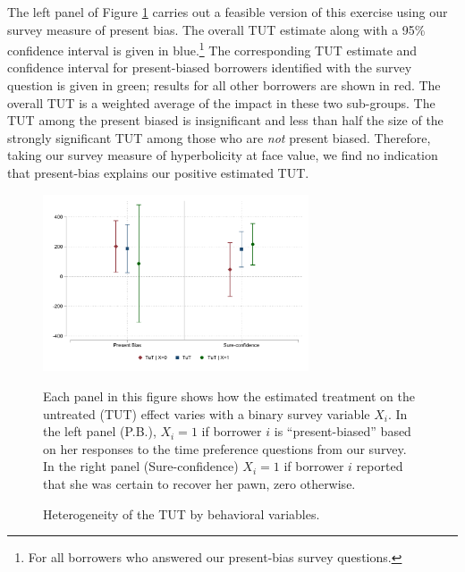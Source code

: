 \documentclass[11pt, a4paper]{article}
\begin{document}
The left panel of Figure \ref{tut_beh_partition} carries out a feasible version of this exercise using our survey measure of present bias.
The overall TUT estimate along with a 95\% confidence interval is given in blue.\footnote{For all borrowers who answered our present-bias survey questions.}
The corresponding TUT estimate and confidence interval for present-biased borrowers identified with the survey question is given in green; results for all other borrowers are shown in red.
The overall TUT is a weighted average of the impact in these two sub-groups.  The TUT among the present biased is insignificant and less than half the size of the strongly significant TUT among those who are \textit{not} present biased. Therefore, taking our survey measure of hyperbolicity at face value, we find no indication that present-bias explains our positive estimated TUT. 



\begin{figure}
    \begin{center}
        \centering
        \includegraphics[width=0.7\textwidth]{Figuras/tut_beh_partition.pdf} 
    \end{center}
     \scriptsize  
\caption{Heterogeneity of the TUT by behavioral variables.}
\scriptsize{Each panel in this figure shows how the estimated treatment on the untreated (TUT) effect varies with a binary survey variable $X_i$. In the left panel (P.B.), $X_i = 1$ if borrower $i$ is ``present-biased'' based on her responses to the time preference questions from our survey. In the right panel (Sure-confidence) $X_i = 1$ if  borrower $i$ reported that she was certain to recover her pawn, zero otherwise. }

    \label{tut_beh_partition}

\end{figure}
\end{document}
